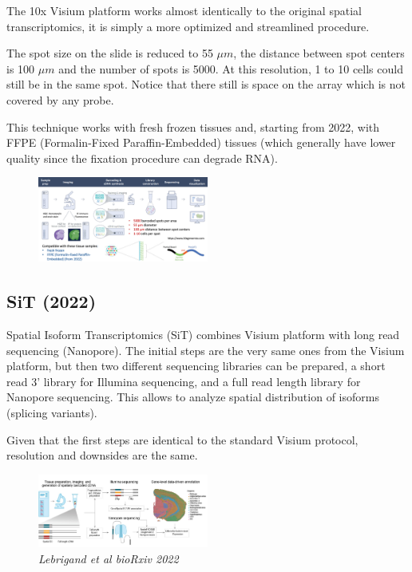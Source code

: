The 10x Visium platform works almost identically to the original spatial 
transcriptomics, it is simply a more optimized and streamlined procedure.

The spot size on the slide is reduced to 55 $\mu m$, the distance between spot 
centers is 100 $\mu m$ and the number of spots is 5000. At this resolution, 1 
to 10 cells could still be in the same spot. Notice that there still is space 
on the array which is not covered by any probe.

This technique works with fresh frozen tissues and, starting from 2022, with 
FFPE (Formalin-Fixed Paraffin-Embedded) tissues (which generally have lower 
quality since the fixation procedure can degrade RNA). 

\begin{figure}
\centering
\includegraphics[width=0.5\textwidth]{images/Screenshot.png}
\caption{}
\end{figure}

\hypertarget{sit-2022}{%
\subsection{SiT (2022)}\label{sit-2022}}

Spatial Isoform Transcriptomics (SiT) combines Visium platform with long read
sequencing (Nanopore). The initial steps are the very same ones from the 
Visium platform, but then two different sequencing libraries can be prepared,
a short read 3' library for Illumina sequencing, and a full read length
library for Nanopore sequencing. This allows to analyze spatial distribution
of isoforms (splicing variants).

Given that the first steps are identical to the standard Visium protocol, 
resolution and downsides are the same.

\begin{figure}
\centering
\includegraphics[width=0.5\textwidth]{images/Screenshot_4.png}
\caption{\emph{Lebrigand et al bioRxiv 2022}}
\end{figure}

